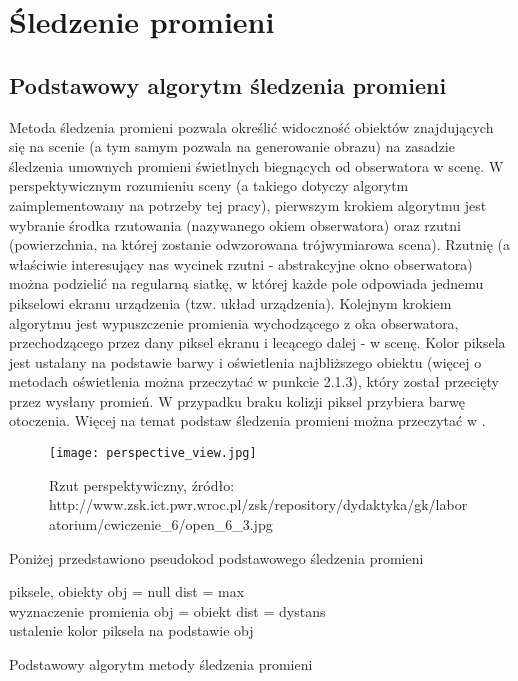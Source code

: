 \section{Śledzenie promieni}

\subsection{Podstawowy algorytm śledzenia promieni}

Metoda śledzenia promieni pozwala określić widoczność obiektów znajdujących
się na scenie (a tym samym pozwala na generowanie obrazu) na zasadzie śledzenia umownych promieni świetlnych biegnących od obserwatora w scenę. W perspektywicznym rozumieniu sceny (a takiego dotyczy algorytm zaimplementowany na potrzeby tej pracy), pierwszym krokiem algorytmu jest wybranie środka rzutowania (nazywanego okiem obserwatora) oraz rzutni (powierzchnia, na której zostanie odwzorowana trójwymiarowa scena). Rzutnię (a właściwie interesujący nas wycinek rzutni - abstrakcyjne okno obserwatora) można podzielić na regularną siatkę, w której każde pole odpowiada jednemu pikselowi ekranu urządzenia (tzw. układ urządzenia). Kolejnym krokiem algorytmu jest wypuszczenie promienia wychodzącego z oka obserwatora, przechodzącego przez dany piksel ekranu i lecącego dalej - w scenę. Kolor piksela jest ustalany na podstawie barwy i oświetlenia najbliższego obiektu (więcej o metodach oświetlenia można przeczytać w punkcie 2.1.3), który został przecięty przez wysłany promień. W przypadku braku kolizji piksel przybiera barwę otoczenia. Więcej na temat podstaw śledzenia promieni można przeczytać w \cite{foley95, suffern2007, scratch}.

\begin{figure}[H]
\centering
\texttt{[image: perspective\_view.jpg]}
\caption{Rzut perspektywiczny, źródło: http://www.zsk.ict.pwr.wroc.pl/zsk/\newline repository/dydaktyka/gk/laboratorium/cwiczenie\_6/open\_6\_3.jpg}
\end{figure}

\pagebreak
\noindent
Poniżej przedstawiono pseudokod podstawowego śledzenia promieni

\begin{algorithm}[H]
\begin{algorithmic}
\State piksele, obiekty
\State obj = null
\State dist = max
\\
	 \State wyznaczenie promienia
    		\State obj = obiekt
    		\State dist = dystans
     \EndIf
	 \EndFor
\EndFor
\\
\State ustalenie kolor piksela na podstawie obj
\caption{Podstawowy algorytm metody śledzenia promieni}
\end{algorithmic}
\end{algorithm}

